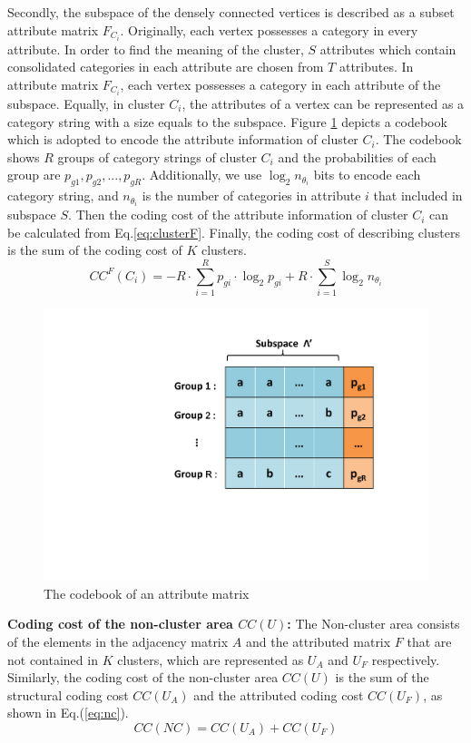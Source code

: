 Secondly, the subspace of the densely connected vertices is described as a subset attribute matrix $F_{C_i}$. Originally, each vertex possesses a category in every attribute. In order to find the meaning of the cluster, $S$ attributes which contain consolidated categories in each attribute are chosen from $T$ attributes. In attribute matrix $F_{C_i}$, each vertex possesses a category in each attribute of the subspace. Equally, in cluster $C_i$, the attributes of a vertex can be represented as a category string with a size equals to the subspace. Figure \ref{fig:codebook} depicts a codebook which is adopted to encode the attribute information of cluster $C_i$. The codebook shows $R$ groups of category strings of cluster $C_i$ and the probabilities of each group are $p_{g1},p_{g2},...,p_{gR}$. Additionally, we use $\log_2 n_{\theta_i}$ bits to encode each category string, and $n_{\theta_i}$ is the number of categories in attribute $i$ that included in subspace $S$. Then the coding cost of the attribute information of cluster $C_i$ can be calculated from Eq.\ref{eq:clusterF}. Finally, the coding cost of describing clusters is the sum of the coding cost of $K$ clusters.
\begin{equation}
CC^F(C_i)= - R \cdot \sum_{i=1}^R p_{gi}\cdot \log_2 p_{gi} + R \cdot \sum_{i=1}^S \log_2 n_{\theta_i}
\label{eq:clusterF}
\end{equation}

\begin{figure}[h]
\centering
\includegraphics[width = 0.6\columnwidth]{figure/codebook.pdf}
\vspace{-3mm}
\caption{The codebook of an attribute matrix}
\label{fig:codebook}
\end{figure}

\noindent \textbf{Coding cost of the non-cluster area $CC(U)$:} The Non-cluster area consists of the elements in the adjacency matrix $A$ and the attributed matrix $F$ that are not contained in $K$ clusters, which are represented as $U_A$ and $U_F$ respectively. Similarly, the coding cost of the non-cluster area $CC(U)$ is the sum of the structural coding cost $CC(U_A)$ and the attributed coding cost $CC(U_F)$, as shown in Eq.(\ref{eq:nc}). 
\begin{equation}
CC(NC) = CC(U_A) + CC(U_F)
\label{eq:nc}
\end{equation}

